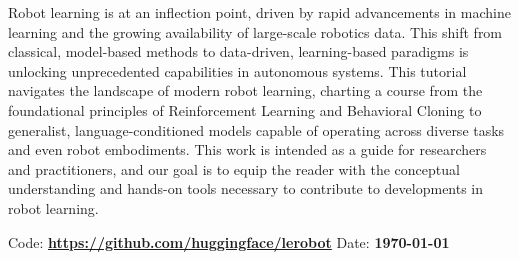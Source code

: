 Robot learning is at an inflection point, driven by rapid advancements in machine learning and the growing availability of large-scale robotics data. 
This shift from classical, model-based methods to data-driven, learning-based paradigms is unlocking unprecedented capabilities in autonomous systems. 
This tutorial navigates the landscape of modern robot learning, charting a course from the foundational principles of Reinforcement Learning and Behavioral Cloning to generalist, language-conditioned models capable of operating across diverse tasks and even robot embodiments.
This work is intended as a guide for researchers and practitioners, and our goal is to equip the reader with the conceptual understanding and hands-on tools necessary to contribute to developments in robot learning.
\newline

Code: \textbf{\url{https://github.com/huggingface/lerobot}}
\newline
Date: \textbf{\today}